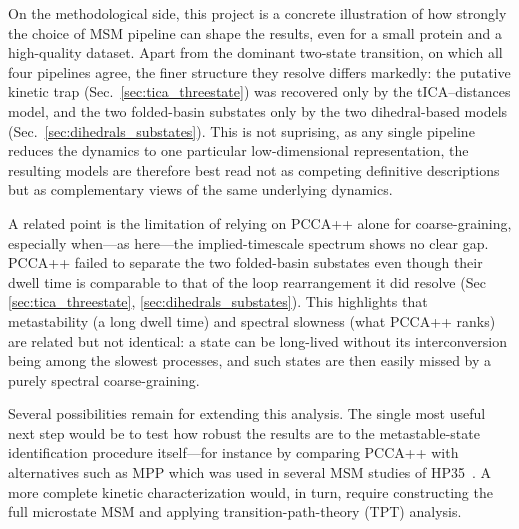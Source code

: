 \documentclass[prl,twocolumn]{revtex4-1}
\begin{document}
On the methodological side, this project is a concrete illustration of how strongly the choice of MSM pipeline can shape the results,  even for a small protein and a high-quality dataset. Apart from the dominant two-state transition, on which all four pipelines agree, the finer structure they resolve differs markedly: the putative kinetic trap (Sec.~\ref{sec:tica_threestate}) was recovered only by the tICA--distances model, and the two folded-basin substates only by the two dihedral-based models (Sec.~\ref{sec:dihedrals_substates}). This is not suprising, as any single pipeline reduces the dynamics to one particular low-dimensional representation, the resulting models are therefore best read not as competing definitive descriptions but as complementary views of the same underlying dynamics.

A related point is the limitation of relying on PCCA++ alone for coarse-graining, especially when---as here---the implied-timescale spectrum shows no clear gap. PCCA++ failed to separate the two folded-basin substates even though their dwell time is comparable to that of the loop rearrangement it did resolve (Sec  \ref{sec:tica_threestate}, \ref{sec:dihedrals_substates}). This highlights that metastability (a long dwell time) and spectral slowness (what PCCA++ ranks) are related but not identical: a state can be long-lived without its interconversion being among the slowest processes, and such states are then easily missed by a purely spectral coarse-graining.


Several possibilities remain for extending this analysis. The single most useful next step would be to test how robust the results are to the metastable-state identification procedure itself---for instance by comparing PCCA++ with alternatives such as MPP which was used in several MSM studies of HP35~\cite{hierarchical_hp35,  Sittel2018, selecting_features}. A more complete kinetic characterization would, in turn, require constructing the full microstate MSM and applying transition-path-theory (TPT) analysis. 
%
%
%
\end{document}
